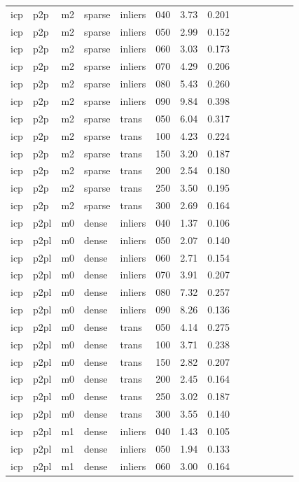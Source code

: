 \begin{table}[htbp]
\begin{tabular}{llllllrrrrrrrr}
  icp & p2p & m2 & sparse & inliers & 040 & 3.73 & 0.201 \\
  icp & p2p & m2 & sparse & inliers & 050 & 2.99 & 0.152 \\
  icp & p2p & m2 & sparse & inliers & 060 & 3.03 & 0.173 \\
  icp & p2p & m2 & sparse & inliers & 070 & 4.29 & 0.206 \\
  icp & p2p & m2 & sparse & inliers & 080 & 5.43 & 0.260 \\
  icp & p2p & m2 & sparse & inliers & 090 & 9.84 & 0.398 \\
  icp & p2p & m2 & sparse & trans & 050 & 6.04 & 0.317 \\
  icp & p2p & m2 & sparse & trans & 100 & 4.23 & 0.224 \\
  icp & p2p & m2 & sparse & trans & 150 & 3.20 & 0.187 \\
  icp & p2p & m2 & sparse & trans & 200 & 2.54 & 0.180 \\
  icp & p2p & m2 & sparse & trans & 250 & 3.50 & 0.195 \\
  icp & p2p & m2 & sparse & trans & 300 & 2.69 & 0.164 \\
  icp & p2pl & m0 & dense & inliers & 040 & 1.37 & 0.106 \\
  icp & p2pl & m0 & dense & inliers & 050 & 2.07 & 0.140 \\
  icp & p2pl & m0 & dense & inliers & 060 & 2.71 & 0.154 \\
  icp & p2pl & m0 & dense & inliers & 070 & 3.91 & 0.207 \\
  icp & p2pl & m0 & dense & inliers & 080 & 7.32 & 0.257 \\
  icp & p2pl & m0 & dense & inliers & 090 & 8.26 & 0.136 \\
  icp & p2pl & m0 & dense & trans & 050 & 4.14 & 0.275 \\
  icp & p2pl & m0 & dense & trans & 100 & 3.71 & 0.238 \\
  icp & p2pl & m0 & dense & trans & 150 & 2.82 & 0.207 \\
  icp & p2pl & m0 & dense & trans & 200 & 2.45 & 0.164 \\
  icp & p2pl & m0 & dense & trans & 250 & 3.02 & 0.187 \\
  icp & p2pl & m0 & dense & trans & 300 & 3.55 & 0.140 \\
  icp & p2pl & m1 & dense & inliers & 040 & 1.43 & 0.105 \\
  icp & p2pl & m1 & dense & inliers & 050 & 1.94 & 0.133 \\
  icp & p2pl & m1 & dense & inliers & 060 & 3.00 & 0.164 \\

\end{tabular}
\end{table}
